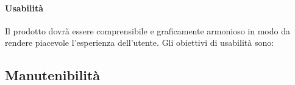 \paragraph{Usabilità}
Il prodotto dovrà essere comprensibile e graficamente armonioso in modo da rendere piacevole l'esperienza dell'utente. Gli obiettivi di usabilità sono:
\
\subsection{Manutenibilità}